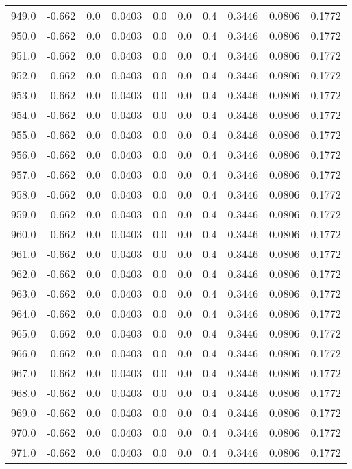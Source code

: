 \begin{longtable}{lrrrrrrrrr}
949.0 & -0.662 & 0.0 & 0.0403 & 0.0 & 0.0 & 0.4 & 0.3446 & 0.0806 & 0.1772 \\
950.0 & -0.662 & 0.0 & 0.0403 & 0.0 & 0.0 & 0.4 & 0.3446 & 0.0806 & 0.1772 \\
951.0 & -0.662 & 0.0 & 0.0403 & 0.0 & 0.0 & 0.4 & 0.3446 & 0.0806 & 0.1772 \\
952.0 & -0.662 & 0.0 & 0.0403 & 0.0 & 0.0 & 0.4 & 0.3446 & 0.0806 & 0.1772 \\
953.0 & -0.662 & 0.0 & 0.0403 & 0.0 & 0.0 & 0.4 & 0.3446 & 0.0806 & 0.1772 \\
954.0 & -0.662 & 0.0 & 0.0403 & 0.0 & 0.0 & 0.4 & 0.3446 & 0.0806 & 0.1772 \\
955.0 & -0.662 & 0.0 & 0.0403 & 0.0 & 0.0 & 0.4 & 0.3446 & 0.0806 & 0.1772 \\
956.0 & -0.662 & 0.0 & 0.0403 & 0.0 & 0.0 & 0.4 & 0.3446 & 0.0806 & 0.1772 \\
957.0 & -0.662 & 0.0 & 0.0403 & 0.0 & 0.0 & 0.4 & 0.3446 & 0.0806 & 0.1772 \\
958.0 & -0.662 & 0.0 & 0.0403 & 0.0 & 0.0 & 0.4 & 0.3446 & 0.0806 & 0.1772 \\
959.0 & -0.662 & 0.0 & 0.0403 & 0.0 & 0.0 & 0.4 & 0.3446 & 0.0806 & 0.1772 \\
960.0 & -0.662 & 0.0 & 0.0403 & 0.0 & 0.0 & 0.4 & 0.3446 & 0.0806 & 0.1772 \\
961.0 & -0.662 & 0.0 & 0.0403 & 0.0 & 0.0 & 0.4 & 0.3446 & 0.0806 & 0.1772 \\
962.0 & -0.662 & 0.0 & 0.0403 & 0.0 & 0.0 & 0.4 & 0.3446 & 0.0806 & 0.1772 \\
963.0 & -0.662 & 0.0 & 0.0403 & 0.0 & 0.0 & 0.4 & 0.3446 & 0.0806 & 0.1772 \\
964.0 & -0.662 & 0.0 & 0.0403 & 0.0 & 0.0 & 0.4 & 0.3446 & 0.0806 & 0.1772 \\
965.0 & -0.662 & 0.0 & 0.0403 & 0.0 & 0.0 & 0.4 & 0.3446 & 0.0806 & 0.1772 \\
966.0 & -0.662 & 0.0 & 0.0403 & 0.0 & 0.0 & 0.4 & 0.3446 & 0.0806 & 0.1772 \\
967.0 & -0.662 & 0.0 & 0.0403 & 0.0 & 0.0 & 0.4 & 0.3446 & 0.0806 & 0.1772 \\
968.0 & -0.662 & 0.0 & 0.0403 & 0.0 & 0.0 & 0.4 & 0.3446 & 0.0806 & 0.1772 \\
969.0 & -0.662 & 0.0 & 0.0403 & 0.0 & 0.0 & 0.4 & 0.3446 & 0.0806 & 0.1772 \\
970.0 & -0.662 & 0.0 & 0.0403 & 0.0 & 0.0 & 0.4 & 0.3446 & 0.0806 & 0.1772 \\
971.0 & -0.662 & 0.0 & 0.0403 & 0.0 & 0.0 & 0.4 & 0.3446 & 0.0806 & 0.1772 \\

\end{longtable}
